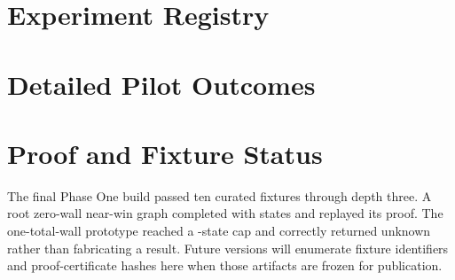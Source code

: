 \section{Experiment Registry}


\section{Detailed Pilot Outcomes}


\section{Proof and Fixture Status}
The final Phase One build passed ten curated fixtures through depth three. A root zero-wall near-win graph completed with \ZeroWallStates states and replayed its proof. The one-total-wall prototype reached a \LowWallStateCeiling-state cap and correctly returned unknown rather than fabricating a result. Future versions will enumerate fixture identifiers and proof-certificate hashes here when those artifacts are frozen for publication.
